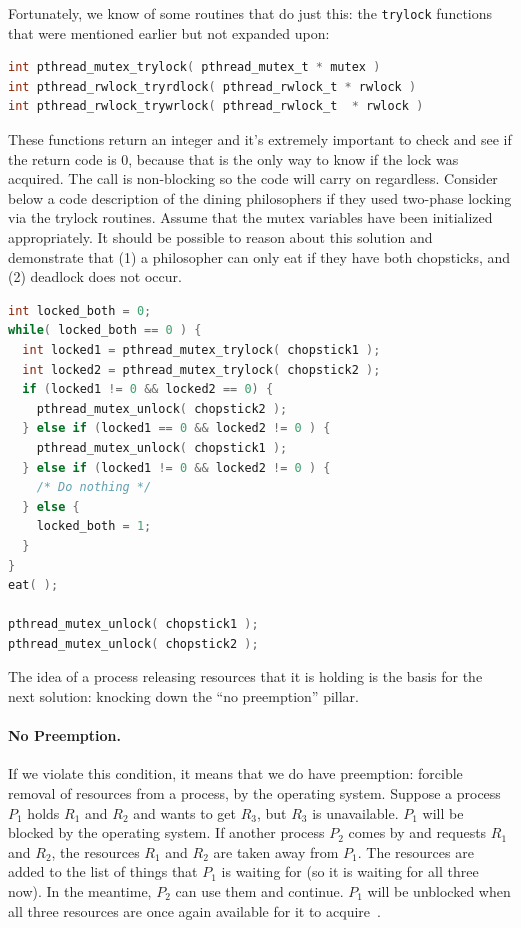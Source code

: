 Fortunately, we know of some routines that do just this: the \texttt{trylock} functions that were mentioned earlier but not expanded upon:
\begin{lstlisting}[language=C]
int pthread_mutex_trylock( pthread_mutex_t * mutex )
int pthread_rwlock_tryrdlock( pthread_rwlock_t * rwlock )
int pthread_rwlock_trywrlock( pthread_rwlock_t  * rwlock )
\end{lstlisting}

These functions return an integer and it's extremely important to check and see if the return code is 0, because that is the only way to know if the lock was acquired. The call is non-blocking so the code will carry on regardless. Consider below a code description of the dining philosophers if they used two-phase locking via the trylock routines. Assume that the mutex variables have been initialized appropriately. It should be possible to reason about this solution and demonstrate that (1) a philosopher can only eat if they have both chopsticks, and (2) deadlock does not occur.

\begin{lstlisting}[language=C]
int locked_both = 0;
while( locked_both == 0 ) {
  int locked1 = pthread_mutex_trylock( chopstick1 );
  int locked2 = pthread_mutex_trylock( chopstick2 );
  if (locked1 != 0 && locked2 == 0) {
    pthread_mutex_unlock( chopstick2 );
  } else if (locked1 == 0 && locked2 != 0 ) {
    pthread_mutex_unlock( chopstick1 );
  } else if (locked1 != 0 && locked2 != 0 ) {
    /* Do nothing */
  } else {
    locked_both = 1;
  }
}
eat( );

pthread_mutex_unlock( chopstick1 );
pthread_mutex_unlock( chopstick2 );
\end{lstlisting}

The idea of a process releasing resources that it is holding is the basis for the next solution: knocking down the ``no preemption'' pillar.


\paragraph{No Preemption.} If we violate this condition, it means that we do have preemption: forcible removal of resources from a process, by the operating system. Suppose a process $P_{1}$ holds $R_{1}$ and $R_{2}$ and wants to get $R_{3}$, but $R_{3}$ is unavailable. $P_{1}$ will be blocked by the operating system. If another process $P_{2}$ comes by and requests $R_{1}$ and $R_{2}$, the resources $R_{1}$ and $R_{2}$ are taken away from $P_{1}$. The resources are added to the list of things that $P_{1}$ is waiting for (so it is waiting for all three now). In the meantime, $P_{2}$ can use them and continue. $P_{1}$ will be unblocked when all three resources are once again available for it to acquire~\cite{osc}. 

